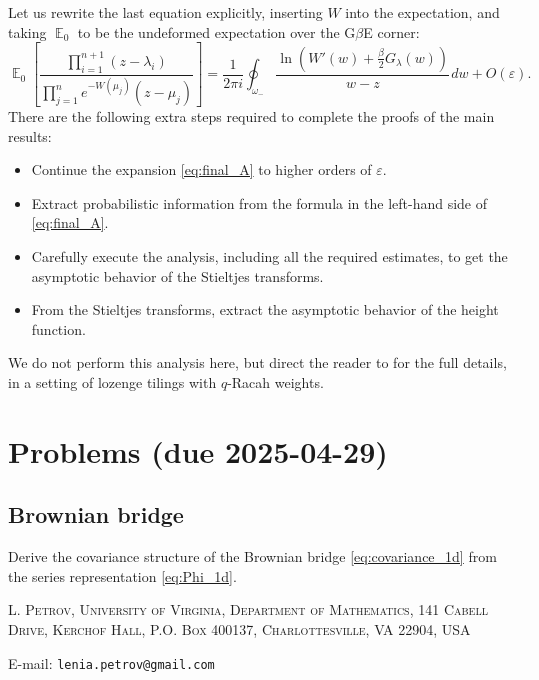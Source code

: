 \documentclass[letterpaper,11pt,oneside,reqno]{article}
\numberwithin{equation}{section}
\newcommand{\ssp}{\hspace{1pt}}
\theoremstyle{definition}
\begin{document}
Let us rewrite the last equation explicitly, inserting $W$ into the 
expectation, and taking $\operatorname{\mathbb{E}}_0$ to be the 
undeformed expectation over the G$\beta$E corner:
\begin{equation}
	\label{eq:final_A}
	\operatorname{\mathbb{E}}_0
	\left[ 
		\frac{\prod_{i=1}^{n+1}(z-\lambda_i)}{\prod_{j=1}^{n}e^{-W(\mu_j)}(z-\mu_j)}
	\right]
	=
	\frac{1}{2 \pi i}\oint_{\omega_-}
	\frac{\ln
	\left( 
		W'(w)+\frac{\beta}{2}G_\lambda(w)
	\right)}{w-z}\ssp dw+O(\varepsilon).
\end{equation}
There are the following extra steps required to complete the proofs of the main
results:
\begin{itemize}
	\item Continue the expansion \eqref{eq:final_A} to higher orders of $\varepsilon$.
	\item Extract probabilistic information from the formula in the left-hand side of 
		\eqref{eq:final_A}.
	\item Carefully execute the analysis, including all the required estimates,
		to get the asymptotic behavior of the Stieltjes transforms.
	\item From the Stieltjes transforms, extract the asymptotic behavior of the height function.
\end{itemize}

We do not perform this analysis here, but 
direct the reader to \cite{gorin2022dynamical} for the full details,
in a setting of lozenge tilings with $q$-Racah weights.



\appendix
\setcounter{section}{8}

\section{Problems (due 2025-04-29)}

\subsection{Brownian bridge}

Derive the covariance structure of the Brownian bridge
\eqref{eq:covariance_1d} from the series representation
\eqref{eq:Phi_1d}.







\medskip

\textsc{L. Petrov, University of Virginia, Department of Mathematics, 141 Cabell Drive, Kerchof Hall, P.O. Box 400137, Charlottesville, VA 22904, USA}

E-mail: \texttt{lenia.petrov@gmail.com}
\end{document}
